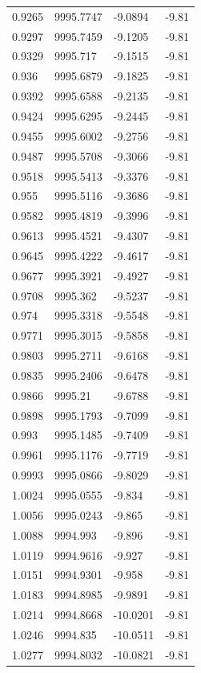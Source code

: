 \begin{table}[H]
\begin{tabular}{llll}
0.9265 & 9995.7747 & -9.0894 & -9.81 \\
0.9297 & 9995.7459 & -9.1205 & -9.81 \\
0.9329 & 9995.717 & -9.1515 & -9.81 \\
0.936 & 9995.6879 & -9.1825 & -9.81 \\
0.9392 & 9995.6588 & -9.2135 & -9.81 \\
0.9424 & 9995.6295 & -9.2445 & -9.81 \\
0.9455 & 9995.6002 & -9.2756 & -9.81 \\
0.9487 & 9995.5708 & -9.3066 & -9.81 \\
0.9518 & 9995.5413 & -9.3376 & -9.81 \\
0.955 & 9995.5116 & -9.3686 & -9.81 \\
0.9582 & 9995.4819 & -9.3996 & -9.81 \\
0.9613 & 9995.4521 & -9.4307 & -9.81 \\
0.9645 & 9995.4222 & -9.4617 & -9.81 \\
0.9677 & 9995.3921 & -9.4927 & -9.81 \\
0.9708 & 9995.362 & -9.5237 & -9.81 \\
0.974 & 9995.3318 & -9.5548 & -9.81 \\
0.9771 & 9995.3015 & -9.5858 & -9.81 \\
0.9803 & 9995.2711 & -9.6168 & -9.81 \\
0.9835 & 9995.2406 & -9.6478 & -9.81 \\
0.9866 & 9995.21 & -9.6788 & -9.81 \\
0.9898 & 9995.1793 & -9.7099 & -9.81 \\
0.993 & 9995.1485 & -9.7409 & -9.81 \\
0.9961 & 9995.1176 & -9.7719 & -9.81 \\
0.9993 & 9995.0866 & -9.8029 & -9.81 \\
1.0024 & 9995.0555 & -9.834 & -9.81 \\
1.0056 & 9995.0243 & -9.865 & -9.81 \\
1.0088 & 9994.993 & -9.896 & -9.81 \\
1.0119 & 9994.9616 & -9.927 & -9.81 \\
1.0151 & 9994.9301 & -9.958 & -9.81 \\
1.0183 & 9994.8985 & -9.9891 & -9.81 \\
1.0214 & 9994.8668 & -10.0201 & -9.81 \\
1.0246 & 9994.835 & -10.0511 & -9.81 \\
1.0277 & 9994.8032 & -10.0821 & -9.81 \\

\end{tabular}
\end{table}

